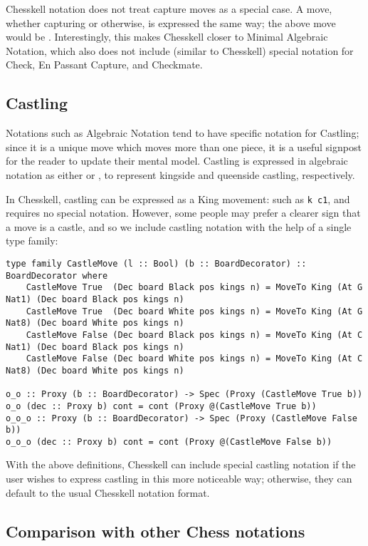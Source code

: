 \documentclass[12pt, a4paper, bibliography=totocnumbered]{scrreprt}
\newcommand{\inline}[1]{\lstinline[basicstyle=\ttfamily\footnotesize]{#1}}
\begin{document}
Chesskell notation does not treat capture moves as a special case. A move, whether capturing or otherwise, is expressed the same way; the above move would be . Interestingly, this makes Chesskell closer to Minimal Algebraic Notation, which also does not include (similar to Chesskell) special notation for Check, En Passant Capture, and Checkmate.

\subsection{Castling}

Notations such as Algebraic Notation tend to have specific notation for Castling; since it is a unique move which moves more than one piece, it is a useful signpost for the reader to update their mental model. Castling is expressed in algebraic notation as either  or , to represent kingside and queenside castling, respectively.

In Chesskell, castling can be expressed as a King movement: such as \inline{k c1}, and requires no special notation. However, some people may prefer a clearer sign that a move is a castle, and so we include castling notation with the help of a single type family:

\begin{lstlisting}
type family CastleMove (l :: Bool) (b :: BoardDecorator) :: BoardDecorator where
    CastleMove True  (Dec board Black pos kings n) = MoveTo King (At G Nat1) (Dec board Black pos kings n)
    CastleMove True  (Dec board White pos kings n) = MoveTo King (At G Nat8) (Dec board White pos kings n)
    CastleMove False (Dec board Black pos kings n) = MoveTo King (At C Nat1) (Dec board Black pos kings n)
    CastleMove False (Dec board White pos kings n) = MoveTo King (At C Nat8) (Dec board White pos kings n)

o_o :: Proxy (b :: BoardDecorator) -> Spec (Proxy (CastleMove True b))
o_o (dec :: Proxy b) cont = cont (Proxy @(CastleMove True b))
o_o_o :: Proxy (b :: BoardDecorator) -> Spec (Proxy (CastleMove False b))
o_o_o (dec :: Proxy b) cont = cont (Proxy @(CastleMove False b))
\end{lstlisting}

With the above definitions, Chesskell can include special castling notation if the user wishes to express castling in this more noticeable way; otherwise, they can default to the usual Chesskell notation format.

\subsection{Comparison with other Chess notations}
\end{document}
